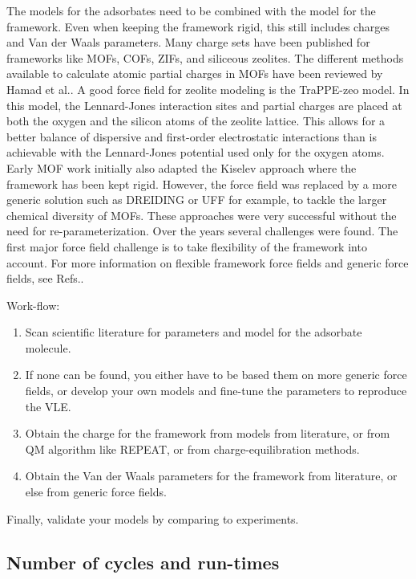The models for the adsorbates need to be combined with the model for the framework.
Even when keeping the framework rigid, this still includes charges and Van der Waals parameters.
Many charge sets have been published for frameworks like
MOFs\cite{Xu2010,Parkes2013,Nazarian2016},
COFs\cite{Zheng2010},
ZIFs\cite{Rana2011,GutierrezSevillano2013b},
and siliceous zeolites\cite{Wolffis2019}.
The different methods available to calculate atomic partial charges in MOFs have been reviewed by Hamad et al.\cite{Hamad2015}.
A good force field for zeolite modeling is the TraPPE-zeo model\cite{Bai2013}. In this model, the
Lennard-Jones interaction sites and partial charges are placed at both the oxygen and the silicon atoms of the zeolite lattice.
This allows for a better balance of dispersive and first-order electrostatic interactions than is
achievable with the Lennard-Jones potential used only for the oxygen atoms.
Early MOF work initially also adapted the Kiselev approach where the framework has been kept rigid. However, the force field was replaced by a more generic
solution such as DREIDING\cite{Mayo1990} or UFF\cite{Rappe1992} for example, to tackle the larger chemical diversity of MOFs. These approaches were very
successful without the need for re-parameterization\cite{Duren2004, Sarkisov2004, DurenSnurr2004, SarkisovDurenSnurr2004}.
Over the years several challenges were found. The first major force field challenge is to take flexibility
of the framework into account. For more information on flexible framework force fields and generic force fields, see Refs.\cite{Heinen2018,Dubbeldam2019}.

Work-flow:
\begin{enumerate}
\item{Scan scientific literature for parameters and model for the adsorbate molecule.}
\item{If none can be found, you either have to be based them on more generic force fields, or develop your own models and fine-tune
    the parameters to reproduce the VLE.}
\item{Obtain the charge for the framework from models from literature, or from QM algorithm like REPEAT, or from charge-equilibration methods.}
\item{Obtain the Van der Waals parameters for the framework from literature, or else from generic force fields.}
\end{enumerate}
Finally, validate your models by comparing to experiments.

\subsection*{Number of cycles and run-times}

